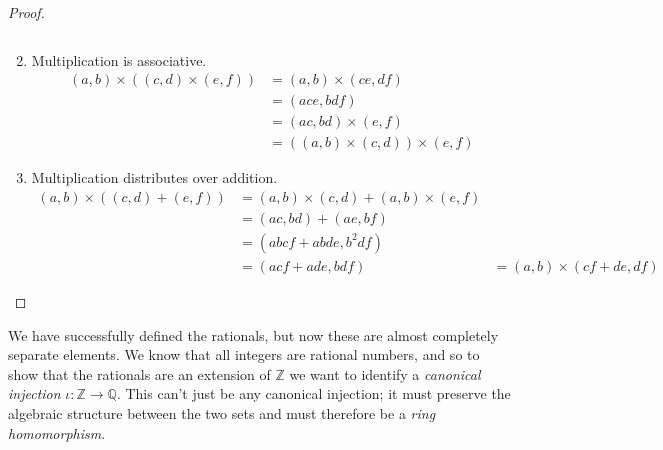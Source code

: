 \documentclass{article}
\begin{document}
\begin{proof}
\begin{enumerate}
\begin{equation}
          \end{equation}
          \item Multiplication is associative. 
          \begin{align}
            (a, b) \times ((c, d) \times (e, f)) & = (a, b) \times (ce, df) \\ 
                                                 & = (ace, bdf) \\
                                                 & = (ac, bd) \times (e, f) \\
                                                 & = ((a, b) \times (c, d)) \times (e, f)
          \end{align}
          \item Multiplication distributes over addition. 
            \begin{align}
              (a, b) \times ((c, d) + (e, f)) & = (a, b) \times (c, d) + (a, b) \times (e, f) \\
                                              & = (ac, bd) + (ae, bf) \\
                                              & = (abcf + abde, b^2 df) \\
                                              & = (acf + ade, bdf)  
                                              & = (a, b) \times (cf + de, df)
            \end{align}
        \end{enumerate}
      \end{proof} 

      We have successfully defined the rationals, but now these are almost completely separate elements. We know that all integers are rational numbers, and so to show that the rationals are an extension of $\mathbb{Z}$ we want to identify a \textit{canonical injection} $\iota: \mathbb{Z} \rightarrow \mathbb{Q}$. This can't just be any canonical injection; it must preserve the algebraic structure between the two sets and must therefore be a \textit{ring homomorphism}. 
\end{document}
